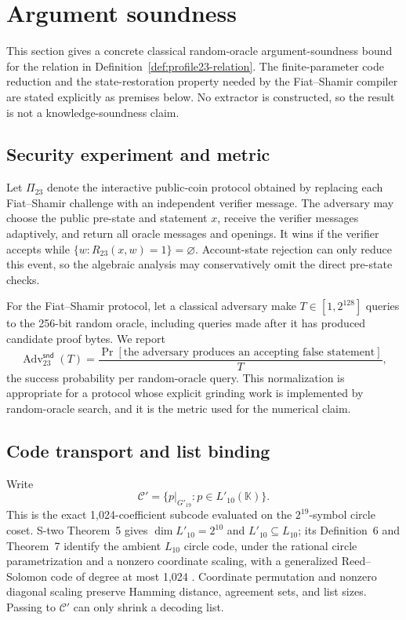 \section{Argument soundness}
\label{sec:soundness}

This section gives a concrete classical random-oracle argument-soundness
bound for the relation in Definition~\ref{def:profile23-relation}.  The
finite-parameter code reduction and the state-restoration property needed by
the Fiat--Shamir compiler are stated explicitly as premises below.  No
extractor is constructed, so the result is not a knowledge-soundness claim.

\subsection{Security experiment and metric}

Let \(\Pi_{23}\) denote the interactive public-coin protocol obtained by
replacing each Fiat--Shamir challenge with an independent verifier message.
The adversary may choose the public pre-state and statement \(x\), receive the
verifier messages adaptively, and return all oracle messages and openings.  It
wins if the verifier accepts while
\(
  \{w:R_{23}(x,w)=1\}=\varnothing
\).
Account-state rejection can only reduce this event, so the algebraic analysis
may conservatively omit the direct pre-state checks.

For the Fiat--Shamir protocol, let a classical adversary make
\(T\in[1,2^{128}]\) queries to the 256-bit random oracle, including queries
made after it has produced candidate proof bytes.  We report
\begin{equation}
 \operatorname{Adv}^{\mathsf{snd}}_{23}(T)
 =\frac{\Pr[\text{the adversary produces an accepting false statement}]}{T},
 \label{eq:work-normalized-soundness}
\end{equation}
the success probability per random-oracle query.  This normalization is
appropriate for a protocol whose explicit grinding work is implemented by
random-oracle search, and it is the metric used for the numerical claim.

\subsection{Code transport and list binding}

Write
\[
 \mathcal C'=
 \{p|_{G'_{19}}:p\in L'_{10}(\mathbb K)\}.
\]
This is the exact 1,024-coefficient subcode evaluated on the
\(2^{19}\)-symbol circle coset.  S-two Theorem~5 gives
\(\dim L'_{10}=2^{10}\) and \(L'_{10}\subseteq L_{10}\); its Definition~6
and Theorem~7 identify the ambient \(L_{10}\) circle code, under the rational
circle parametrization and a nonzero coordinate scaling, with a generalized
Reed--Solomon code of degree at most 1,024
\cite{CarmonEtAl2026Stwo}.  Coordinate permutation and nonzero diagonal
scaling preserve Hamming distance, agreement sets, and list sizes.  Passing
to \(\mathcal C'\) can only shrink a decoding list.

